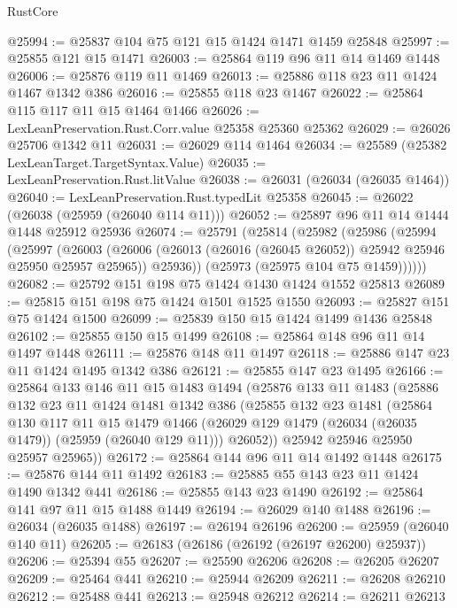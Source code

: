 \begin{lexlean}{RustCore}
\begin{coremodule}
@25994 := @25837 @104 @75 @121 @15 @1424 @1471 @1459 @25848
@25997 := @25855 @121 @15 @1471
@26003 := @25864 @119 @96 @11 @14 @1469 @1448
@26006 := @25876 @119 @11 @1469
@26013 := @25886 @118 @23 @11 @1424 @1467 @1342 @386
@26016 := @25855 @118 @23 @1467
@26022 := @25864 @115 @117 @11 @15 @1464 @1466
@26026 := LexLeanPreservation.Rust.Corr.value @25358 @25360 @25362
@26029 := @26026 @25706 @1342 @11
@26031 := @26029 @114 @1464
@26034 := @25589 (@25382 LexLeanTarget.TargetSyntax.Value)
@26035 := LexLeanPreservation.Rust.litValue
@26038 := @26031 (@26034 (@26035 @1464))
@26040 := LexLeanPreservation.Rust.typedLit @25358
@26045 := @26022 (@26038 (@25959 (@26040 @114 @11)))
@26052 := @25897 @96 @11 @14 @1444 @1448 @25912 @25936
@26074 := @25791
    (@25814
      (@25982
        (@25986
          (@25994
            (@25997
              (@26003
                (@26006 (@26013 (@26016 (@26045 @26052)) @25942 @25946 @25950 @25957 @25965))
                @25936))
            (@25973 (@25975 @104 @75 @1459))))))
@26082 := @25792 @151 @198 @75 @1424 @1430 @1424 @1552 @25813
@26089 := @25815 @151 @198 @75 @1424 @1501 @1525 @1550
@26093 := @25827 @151 @75 @1424 @1500
@26099 := @25839 @150 @15 @1424 @1499 @1436 @25848
@26102 := @25855 @150 @15 @1499
@26108 := @25864 @148 @96 @11 @14 @1497 @1448
@26111 := @25876 @148 @11 @1497
@26118 := @25886 @147 @23 @11 @1424 @1495 @1342 @386
@26121 := @25855 @147 @23 @1495
@26166 := @25864
    @133
    @146
    @11
    @15
    @1483
    @1494
    (@25876
      @133
      @11
      @1483
      (@25886
        @132
        @23
        @11
        @1424
        @1481
        @1342
        @386
        (@25855
          @132
          @23
          @1481
          (@25864
            @130
            @117
            @11
            @15
            @1479
            @1466
            (@26029 @129 @1479 (@26034 (@26035 @1479)) (@25959 (@26040 @129 @11)))
            @26052))
        @25942
        @25946
        @25950
        @25957
        @25965))
@26172 := @25864 @144 @96 @11 @14 @1492 @1448
@26175 := @25876 @144 @11 @1492
@26183 := @25885 @55 @143 @23 @11 @1424 @1490 @1342 @441
@26186 := @25855 @143 @23 @1490
@26192 := @25864 @141 @97 @11 @15 @1488 @1449
@26194 := @26029 @140 @1488
@26196 := @26034 (@26035 @1488)
@26197 := @26194 @26196
@26200 := @25959 (@26040 @140 @11)
@26205 := @26183 (@26186 (@26192 (@26197 @26200) @25937))
@26206 := @25394 @55
@26207 := @25590 @26206
@26208 := @26205 @26207
@26209 := @25464 @441
@26210 := @25944 @26209
@26211 := @26208 @26210
@26212 := @25488 @441
@26213 := @25948 @26212
@26214 := @26211 @26213

\end{coremodule}
\end{lexlean}

